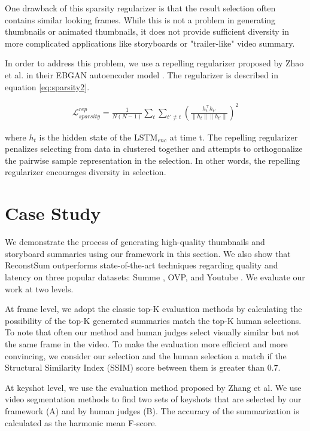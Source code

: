 \documentclass[5pt]{article}
\newcommand{\norm}[1]{\left\lVert#1\right\rVert}
\begin{document}
One drawback of this sparsity regularizer is that the result selection often contains similar looking frames. While this is not a problem in generating thumbnails or animated thumbnails, it does not provide sufficient diversity in more complicated applications like storyboards or "trailer-like" video summary. 

In order to address this problem, we use a repelling regularizer proposed by Zhao et al. in their EBGAN autoencoder model \cite{zhao2016energy}. The regularizer is described in equation \ref{eq:sparsity2}. 

\begin{eqnarray}
\mathcal{L}_{sparsity}^{rep} = \frac{1}{N(N-1)} \sum_{t}\sum_{t' \neq t} (\frac{h^{\intercal}_{t}h_{t'}}{\norm{h_t}\norm{h_{t'}}})^2
\label{eq:sparsity2}
\end{eqnarray}

where $h_t$ is the hidden state of the LSTM$_{enc}$ at time t. The repelling regularizer penalizes selecting from data in clustered together and attempts to orthogonalize the pairwise sample representation in the selection. In other words, the repelling regularizer encourages diversity in selection. 

\section{Case Study}
We demonstrate the process of generating high-quality thumbnails and storyboard summaries using our framework in this section. We also show that ReconstSum outperforms state-of-the-art techniques regarding quality and latency on three popular datasets: Summe \cite{GygliECCV14}, OVP, and Youtube \cite{Avila}. We evaluate our work at two levels. 

At frame level, we adopt the classic top-K evaluation methods by calculating the possibility of the top-K generated summaries match the top-K human selections. To note that often our method and human judges select visually similar but not the same frame in the video. To make the evaluation more efficient and more convincing, we consider our selection and the human selection a match if the Structural Similarity Index (SSIM) score between them is greater than 0.7.

At keyshot level, we use the evaluation method proposed by Zhang et al. We use video segmentation methods to find two sets of keyshots that are selected by our framework (A) and by human judges (B). The accuracy of the summarization is calculated as the harmonic mean F-score.
\end{document}
